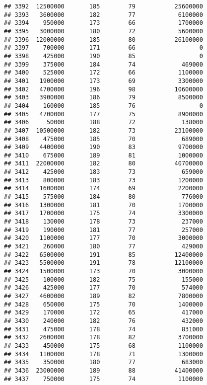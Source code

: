 \documentclass[
]{article}
\begin{document}
\begin{verbatim}
## 3392  12500000       185        79           25600000
## 3393   3600000       182        77            6100000
## 3394    950000       173        66            1700000
## 3395   3000000       180        72            5600000
## 3396  12000000       185        80           26100000
## 3397    700000       171        66                  0
## 3398    425000       190        85                  0
## 3399    375000       184        74             469000
## 3400    525000       172        66            1100000
## 3401   1900000       173        69            3300000
## 3402   4700000       196        98           10600000
## 3403   3900000       186        79            8500000
## 3404    160000       185        76                  0
## 3405   4700000       177        75            8900000
## 3406     50000       188        72             138000
## 3407  10500000       182        73           23100000
## 3408    475000       185        70             689000
## 3409   4400000       190        83            9700000
## 3410    675000       189        81            1000000
## 3411  22000000       182        80           40700000
## 3412    425000       183        73             659000
## 3413    800000       183        73            1200000
## 3414   1600000       174        69            2200000
## 3415    575000       184        80             776000
## 3416   1300000       181        70            1700000
## 3417   1700000       175        74            3300000
## 3418    130000       178        73             237000
## 3419    190000       181        77             257000
## 3420   1100000       177        70            3000000
## 3421    260000       180        77             429000
## 3422   6500000       191        85           12400000
## 3423   5500000       191        78           12100000
## 3424   1500000       173        70            3000000
## 3425    100000       182        75             155000
## 3426    425000       177        70             574000
## 3427   4600000       189        82            7800000
## 3428    650000       175        70            1400000
## 3429    170000       172        65             417000
## 3430    240000       182        76             432000
## 3431    475000       178        74             831000
## 3432   2600000       178        82            3700000
## 3433    450000       175        68            1100000
## 3434   1100000       178        71            1300000
## 3435    350000       180        77             683000
## 3436  23000000       189        88           41400000
## 3437    750000       175        74            1100000

\end{verbatim}
\end{document}
